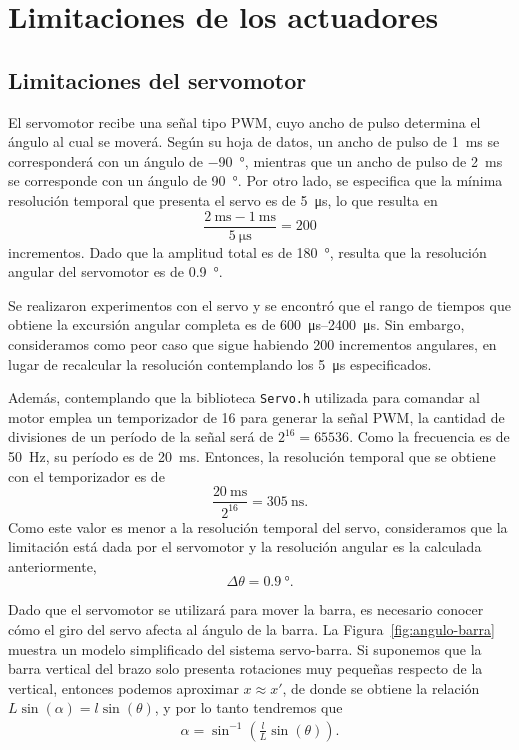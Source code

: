 \section{Limitaciones de los actuadores}

\subsection{Limitaciones del servomotor}

El servomotor recibe una señal tipo PWM, cuyo ancho de pulso determina el ángulo al cual se moverá. Según su hoja de datos, un ancho de pulso de \qty{1}{\ms} se corresponderá con un ángulo de \qty{-90}{\degree}, mientras que un ancho de pulso de \qty{2}{\ms} se corresponde con un ángulo de \qty{90}{\degree}. Por otro lado, se especifica que la mínima resolución temporal que presenta el servo es de \qty{5}{\us}, lo que resulta en
$$\frac{\qty{2}{\ms} - \qty{1}{\ms}}{\qty{5}{\us}} = 200$$
incrementos. Dado que la amplitud total es de \qty{180}{\degree}, resulta que la resolución angular del servomotor es de \qty{0.9}{\degree}.

Se realizaron experimentos con el servo y se encontró que el rango de tiempos que obtiene la excursión angular completa es de \qtyrange{600}{2400}{\us}. Sin embargo, consideramos como peor caso que sigue habiendo 200 incrementos angulares, en lugar de recalcular la resolución contemplando los \qty{5}{\us} especificados.

Además, contemplando que la biblioteca \verb|Servo.h| utilizada para comandar al motor emplea un temporizador de \qty{16}{\bit} para generar la señal PWM, la cantidad de divisiones de un período de la señal será de $2^{16} = 65536$. Como la frecuencia es de \qty{50}{\Hz}, su período es de \qty{20}{\ms}. Entonces, la resolución temporal que se obtiene con el temporizador es de
$$\frac{\qty{20}{\ms}}{2^{16}} = \qty{305}{\ns}.$$
Como este valor es menor a la resolución temporal del servo, consideramos que la limitación está dada por el servomotor y la resolución angular es la calculada anteriormente,
$$\Delta\theta = \qty{0.9}{\degree}.$$

Dado que el servomotor se utilizará para mover la barra, es necesario conocer cómo el giro del servo afecta al ángulo de la barra. La Figura~\ref{fig:angulo-barra} muestra un modelo simplificado del sistema servo-barra. Si suponemos que la barra vertical del brazo solo presenta rotaciones muy pequeñas respecto de la vertical, entonces podemos aproximar $x \approx x'$, de donde se obtiene la relación
$L \sin(\alpha) = l \sin(\theta)$,
y por lo tanto tendremos que
\begin{align*}
    \alpha = \sin^{-1}\left(\frac{l}{L} \sin(\theta)\right).
\end{align*}

